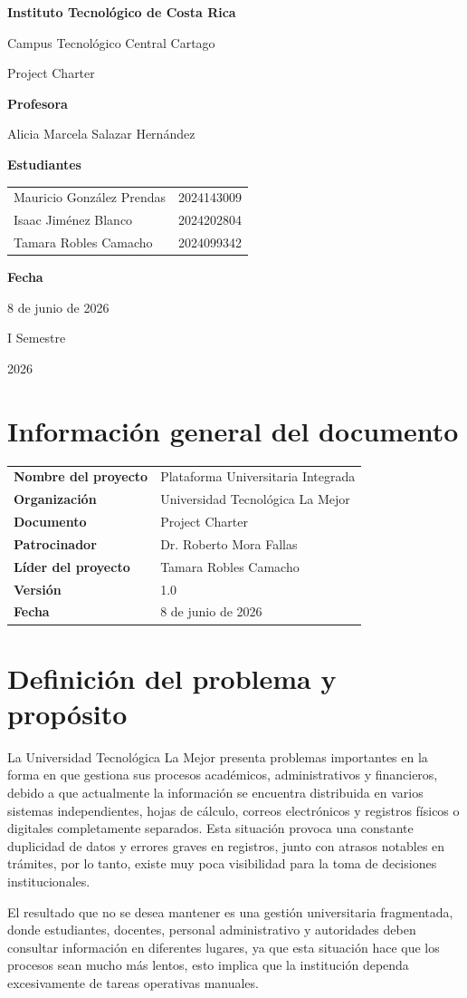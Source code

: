 \documentclass[11pt,spanish]{article}
\title{\DocumentoTitulo}
\author{\AutoresPortada}
\date{\FechaDocumento}
\makeatletter
\newcommand{\Institucion}{Instituto Tecnológico de Costa Rica}
\newcommand{\Campus}{Campus Tecnológico Central Cartago}
\newcommand{\DocumentoTitulo}{Project Charter}
\newcommand{\Profesor}{Alicia Marcela Salazar Hernández}
\newcommand{\FechaDocumento}{8 de junio de 2026}
\newcommand{\PeriodoAcademico}{I Semestre}
\newcommand{\AnioDocumento}{2026}
\newcommand{\AutoresPortada}{%
    \begin{tabular}{l@{\hspace{1.5cm}}r}
        Mauricio González Prendas & 2024143009\\
        Isaac Jiménez Blanco & 2024202804\\
        Tamara Robles Camacho & 2024099342
    \end{tabular}%
}
\newcommand{\MakeCover}{%
\begin{titlepage}
\thispagestyle{empty}
\centering

{\bfseries \huge \Institucion \par}
\vspace{0.25cm}
{\LARGE \Campus \par}

\vfill

{\huge \DocumentoTitulo \par}

\vfill

{\bfseries \LARGE Profesora \par}
{\Large \Profesor \par}

\vfill

{\bfseries \LARGE Estudiantes \par}
{\Large \AutoresPortada \par}

\vfill

{\bfseries\LARGE Fecha \par}
{\Large \FechaDocumento \par}

\vfill

{\LARGE \PeriodoAcademico \par}
{\LARGE \AnioDocumento \par}

\end{titlepage}%
}
\makeatother
\begin{document}
\hypersetup{pageanchor=false}

\MakeCover

\pagestyle{empty}
\tableofcontents
\clearpage
{}
\hypersetup{pageanchor=true}
\pagestyle{fancy}

\section{Información general del documento}

\begin{table}[H]
\centering
\begin{tabularx}{\textwidth}{p{5cm} Y}
\toprule
\textbf{Nombre del proyecto} & Plataforma Universitaria Integrada \\
\textbf{Organización} & Universidad Tecnológica La Mejor \\
\textbf{Documento} & \DocumentoTitulo \\
\textbf{Patrocinador} & Dr. Roberto Mora Fallas \\
\textbf{Líder del proyecto} & Tamara Robles Camacho \\
\textbf{Versión} & 1.0 \\
\textbf{Fecha} & \FechaDocumento \\
\bottomrule
\end{tabularx}
\end{table}

\section{Definición del problema y propósito}

La Universidad Tecnológica La Mejor presenta problemas importantes en la forma en que gestiona sus procesos académicos, administrativos y financieros, debido a que actualmente la información se encuentra distribuida en varios sistemas independientes, hojas de cálculo, correos electrónicos y registros físicos o digitales completamente separados. Esta situación provoca una constante duplicidad de datos y errores graves en registros, junto con atrasos notables en trámites, por lo tanto, existe muy poca visibilidad para la toma de decisiones institucionales.

El resultado que no se desea mantener es una gestión universitaria fragmentada, donde estudiantes, docentes, personal administrativo y autoridades deben consultar información en diferentes lugares, ya que esta situación hace que los procesos sean mucho más lentos, esto implica que la institución dependa excesivamente de tareas operativas manuales.
\end{document}
